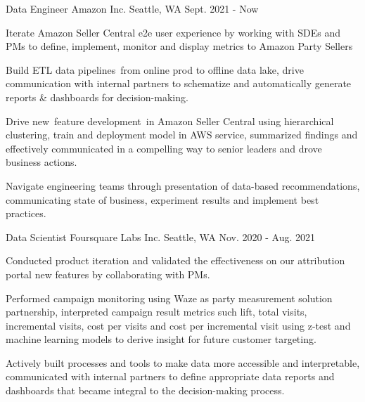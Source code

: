 



\begin{cventries}


	\cventry
	{Data Engineer} %
	{Amazon Inc.} %
	{Seattle, WA} %
	{Sept. 2021 - Now} %
	{
		\begin{cvitems}
			\item{Iterate Amazon Seller Central e2e user experience by working with SDEs and PMs to define, implement, monitor and display metrics to Amazon  Party Sellers}
			\item{Build ETL data pipelines from online prod to offline data lake, drive communication with internal partners to schematize and automatically generate reports \& dashboards for decision-making.}
			\item{Drive new feature development in Amazon Seller Central using hierarchical clustering, train and deployment model in AWS service, summarized findings and effectively communicated in a compelling way to senior leaders and drove business actions.}
			\item{Navigate engineering teams through presentation of data-based recommendations, communicating state of business, experiment results and implement best practices.}
		\end{cvitems}
	}


	\cventry
	{Data Scientist} %
	{Foursquare Labs Inc.} %
	{Seattle, WA} %
	{Nov. 2020 - Aug. 2021} %
	{
		\begin{cvitems}
			\item{Conducted product iteration and validated the effectiveness on our attribution portal new features by collaborating with PMs.}
			\item{Performed campaign monitoring using Waze as  party measurement solution partnership, interpreted campaign result metrics such lift, total visits, incremental visits, cost per visits and cost per incremental visit using z-test and machine learning models to derive insight for future customer targeting.}
			\item{Actively built processes and tools to make data more accessible and interpretable, communicated with internal partners to define appropriate data reports and dashboards that became integral to the decision-making process.}
		\end{cvitems}
	}


\end{cventries}
